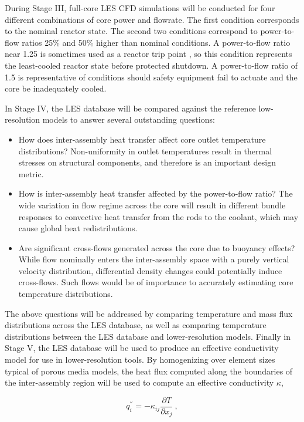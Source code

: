 During Stage III, full-core LES CFD simulations will be conducted for four different combinations of core power and flowrate. The first condition corresponds to the nominal reactor state. The second two conditions correspond to power-to-flow ratios 25\% and 50\% higher than nominal conditions. A power-to-flow ratio near 1.25 is sometimes used as a reactor trip point \cite{chaumont}, so this condition represents the least-cooled reactor state before protected shutdown. A power-to-flow ratio of 1.5 is representative of conditions should safety equipment fail to actuate and the core be inadequately cooled.

In Stage IV, the LES database will be compared against the reference low-resolution models to answer several outstanding questions:

\begin{itemize}
\item How does inter-assembly heat transfer affect core outlet temperature distributions? Non-uniformity in outlet temperatures result in thermal stresses on structural components, and therefore is an important design metric. 
\item How is inter-assembly heat transfer affected by the power-to-flow ratio? The wide variation in flow regime across the core will result in different bundle responses to convective heat transfer from the rods to the coolant, which may cause global heat redistributions. 
\item Are significant cross-flows generated across the core due to buoyancy effects? While flow nominally enters the inter-assembly space with a purely vertical velocity distribution, differential density changes could potentially induce cross-flows. Such flows would be of importance to accurately estimating core temperature distributions.
\end{itemize}

The above questions will be addressed by comparing temperature and mass flux
distributions across the LES database, as well as comparing temperature
distributions between the LES database and lower-resolution models. Finally in
Stage V, the LES database will be used to produce an effective conductivity
model for use in lower-resolution tools. By homogenizing over element sizes
typical of porous media models, the heat flux computed along the boundaries of
the inter-assembly region will be used to compute an effective conductivity
\(\kappa\),

\begin{equation}
q_i^{''}=-\kappa_{ij}\frac{\partial T}{\partial x_j}\ ,
\end{equation}

